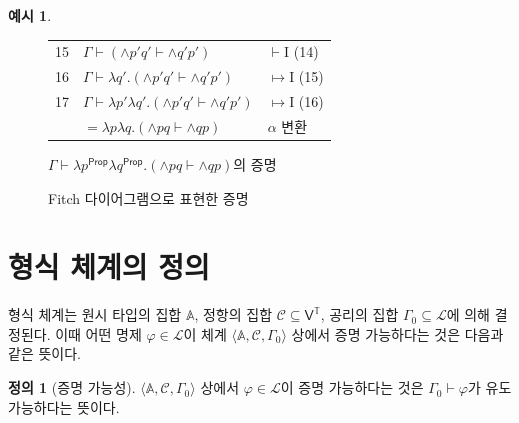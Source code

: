 \documentclass[10pt,twocolumn]{article}
\theoremstyle{definition}
\newtheorem{definition}[theorem]{정의}
\newtheorem{example}[theorem]{예시}
\newcommand{\Prop}{\mathsf{Prop}}
\begin{document}
\begin{example}
\begin{figure}[hbt!]
{\begin{tabular}{lll}
			15 & $\Gamma\vdash ({\land}p'q'\vdash {\land}q'p')$ & $\vdash$I (14) \\
			16 & $\Gamma\vdash \lambda q'.({\land}p'q'\vdash {\land}q'p')$ & $\mapsto$I (15) \\
			17 & $\Gamma\vdash \lambda p'\lambda q'.({\land}p'q'\vdash {\land}q'p')$ & $\mapsto$I (16) \\
			& \qquad\quad$=\lambda p\lambda q.({\land}pq\vdash {\land}qp)$ & $\alpha$ 변환
		\end{tabular}}
		\caption{$\Gamma\vdash \lambda p^\Prop\lambda q^\Prop.({\land}pq\vdash{\land}qp)$의 증명} \label{fig:proof1}
	\end{figure}
	
	\begin{figure}[hbt!] \centering\small{}
		\caption{Fitch 다이어그램으로 표현한 증명} \label{fig:proof2}
	\end{figure}
\end{example}

\section{형식 체계의 정의}

형식 체계는 원시 타입의 집합 $\mathbb A$, 정항의 집합 $\mathcal C\subseteq\mathsf V^{\mathds T}$, 공리의 집합 $\Gamma_0\subseteq\mathcal L$에 의해 결정된다. 이때 어떤 명제 $\varphi\in\mathcal L$이 체계 $\langle\mathbb A,\mathcal C,\Gamma_0\rangle$ 상에서 증명 가능하다는 것은 다음과 같은 뜻이다.

\begin{definition}[증명 가능성]
	$\langle\mathbb A,\mathcal C,\Gamma_0\rangle$ 상에서 $\varphi\in\mathcal L$이 증명 가능하다는 것은 $\Gamma_0\vdash\varphi$가 유도 가능하다는 뜻이다.
\end{definition}
\end{document}
